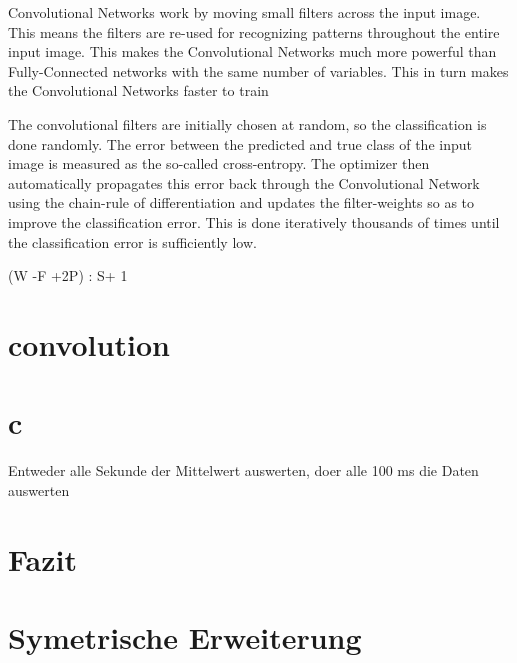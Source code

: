 Convolutional Networks work by moving small filters across the input image. This means the filters are re-used for recognizing patterns throughout the entire input image. This makes the Convolutional Networks much more powerful than Fully-Connected networks with the same number of variables. This in turn makes the Convolutional Networks faster to train




The convolutional filters are initially chosen at random, so the classification is done randomly. The error between the predicted and true class of the input image is measured as the so-called cross-entropy. The optimizer then automatically propagates this error back through the Convolutional Network using the chain-rule of differentiation and updates the filter-weights so as to improve the classification error. This is done iteratively thousands of times until the classification error is sufficiently low.


(W -F +2P) : S+ 1

\section{convolution}


\section{c}

Entweder alle Sekunde der Mittelwert auswerten, doer alle 100 ms die Daten auswerten 

\section{Fazit}


\section{Symetrische Erweiterung}